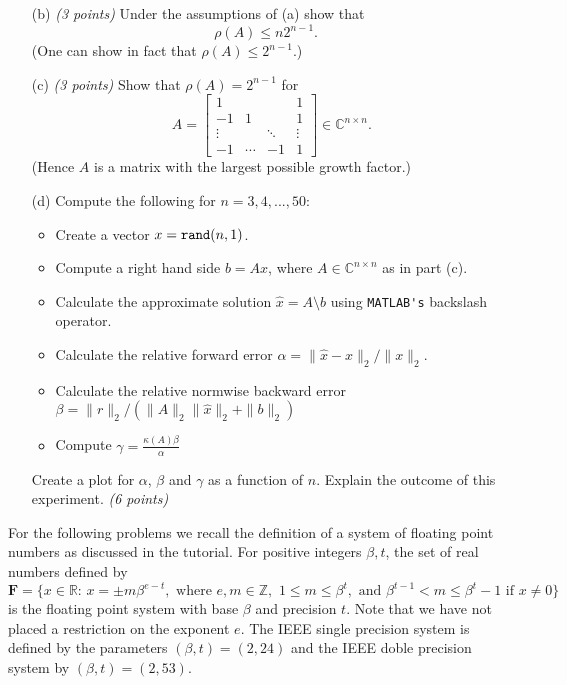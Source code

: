\documentclass[10pt]{report}
\begin{document}
\begin{enumerate}
\begin{enumerate}
\item[(b)] \textit{(3 points)} Under the assumptions of (a) show that 
\[ \rho(A) \leq n2^{n-1}. \,\,\,\,\, \]
(One can show in fact that $\rho(A) \leq 2^{n-1}$.)






    \item[(c)] \textit{(3 points)}  Show that $\rho(A)=2^{n-1}$ for
    \[A=\left[\begin{array}{rccc}1&&&1\\-1&1&&1\\\vdots&&\ddots&\vdots\\-1&\cdots&-1&1\end{array}\right]\in\mathbb{C}^{n\times n}.\]
(Hence $A$ is a matrix with the largest possible growth factor.)
    \item[(d)]Compute the following for $n=3,4,...,50$:
      \begin{itemize}
        \item Create a vector $x=\verb+rand+(n,1)$.
        \item Compute a right hand side $b=Ax$, where $A \in \mathbb{C}^{n \times n}$ as in part (c).
        \item Calculate the approximate solution $\hat{x}=A\setminus b$ using \verb+MATLAB's+ backslash operator.
        \item Calculate the relative forward error $\alpha=\|\hat{x}-x\|_2/\|x\|_2$.
        \item Calculate the relative normwise backward error $\beta=\|r\|_2/(\|A\|_2\|\hat{x}\|_2+\|b\|_2)$
        \item Compute $\gamma=\frac{\kappa(A)\beta}{\alpha}$
        \end{itemize}
        Create a plot for $\alpha$, $\beta$ and $\gamma$ as a function of $n$. Explain the outcome of this experiment.  \textit{(6 points)} 
    \end{enumerate}

\vspace{0.1cm} 


For the following problems we recall the definition of a system of floating point numbers as discussed in the tutorial. For positive integers $\beta, t$, the set of real numbers defined by
\[\mathbf{F}= \{ x \in \mathbb{R}:\,  x = \pm m \beta^{e-t}, \text{ where } e, m \in \mathbb{Z}, \,\,  1 \leq m \leq \beta^t, \text{ and } \beta^{t-1}< m \leq \beta^t -1 \text{ if } x \neq 0\}\]
is the floating point system with base $\beta$ and precision $t$. Note that we have not placed a restriction on the exponent $e$. The IEEE single precision system is defined by the parameters $(\beta, t)=(2,24)$ and the IEEE doble precision system by $(\beta, t)=(2,53)$.


\end{enumerate}
\end{document}
